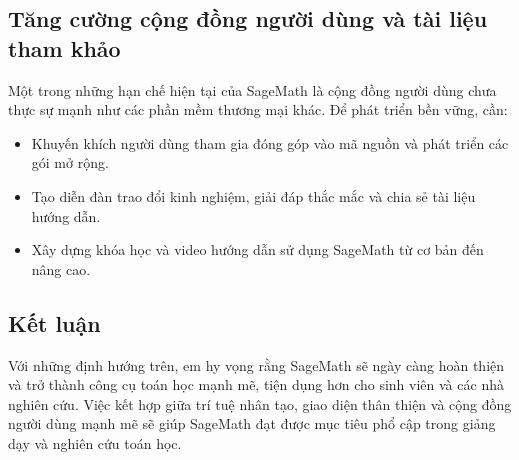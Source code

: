 \subsection{Tăng cường cộng đồng người dùng và tài liệu tham khảo}

Một trong những hạn chế hiện tại của SageMath là cộng đồng người dùng chưa thực sự mạnh như các phần mềm thương mại khác. Để phát triển bền vững, cần:
\begin{itemize}
	\item Khuyến khích người dùng tham gia đóng góp vào mã nguồn và phát triển các gói mở rộng.
	\item Tạo diễn đàn trao đổi kinh nghiệm, giải đáp thắc mắc và chia sẻ tài liệu hướng dẫn.
	\item Xây dựng khóa học và video hướng dẫn sử dụng SageMath từ cơ bản đến nâng cao.
\end{itemize}

\subsection{Kết luận}

Với những định hướng trên, em hy vọng rằng SageMath sẽ ngày càng hoàn thiện và trở thành công cụ toán học mạnh mẽ, tiện dụng hơn cho sinh viên và các nhà nghiên cứu. Việc kết hợp giữa trí tuệ nhân tạo, giao diện thân thiện và cộng đồng người dùng mạnh mẽ sẽ giúp SageMath đạt được mục tiêu phổ cập trong giảng dạy và nghiên cứu toán học.
